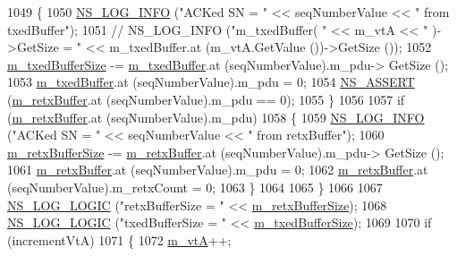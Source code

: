 \begin{DoxyCode}
1049                 \{
1050                   \hyperlink{group__logging_gafbd73ee2cf9f26b319f49086d8e860fb}{NS\_LOG\_INFO} (\textcolor{stringliteral}{"ACKed SN = "} << seqNumberValue << \textcolor{stringliteral}{" from txedBuffer"});
1051                   \textcolor{comment}{//               NS\_LOG\_INFO ("m\_txedBuffer( " << m\_vtA << " )->GetSize = " <<
       m\_txedBuffer.at (m\_vtA.GetValue ())->GetSize ());}
1052                   \hyperlink{classns3_1_1LteRlcAm_add3fe05a0fd3a4ad1fcb7db0239c698f}{m\_txedBufferSize} -= \hyperlink{classns3_1_1LteRlcAm_afabb45c6de7da492347b45c139de0c28}{m\_txedBuffer}.at (seqNumberValue).m\_pdu->
      GetSize ();
1053                   \hyperlink{classns3_1_1LteRlcAm_afabb45c6de7da492347b45c139de0c28}{m\_txedBuffer}.at (seqNumberValue).m\_pdu = 0;
1054                   \hyperlink{assert_8h_a6dccdb0de9b252f60088ce281c49d052}{NS\_ASSERT} (\hyperlink{classns3_1_1LteRlcAm_ab34bb5fce080a41395ad7ea5789af8d0}{m\_retxBuffer}.at (seqNumberValue).m\_pdu == 0);
1055                 \}
1056 
1057               \textcolor{keywordflow}{if} (\hyperlink{classns3_1_1LteRlcAm_ab34bb5fce080a41395ad7ea5789af8d0}{m\_retxBuffer}.at (seqNumberValue).m\_pdu)
1058                 \{
1059                   \hyperlink{group__logging_gafbd73ee2cf9f26b319f49086d8e860fb}{NS\_LOG\_INFO} (\textcolor{stringliteral}{"ACKed SN = "} << seqNumberValue << \textcolor{stringliteral}{" from retxBuffer"});
1060                   \hyperlink{classns3_1_1LteRlcAm_af270916ffd1805b027a7b9cc05c91e7d}{m\_retxBufferSize} -= \hyperlink{classns3_1_1LteRlcAm_ab34bb5fce080a41395ad7ea5789af8d0}{m\_retxBuffer}.at (seqNumberValue).m\_pdu->
      GetSize ();
1061                   \hyperlink{classns3_1_1LteRlcAm_ab34bb5fce080a41395ad7ea5789af8d0}{m\_retxBuffer}.at (seqNumberValue).m\_pdu = 0;
1062                   \hyperlink{classns3_1_1LteRlcAm_ab34bb5fce080a41395ad7ea5789af8d0}{m\_retxBuffer}.at (seqNumberValue).m\_retxCount = 0;
1063                 \}
1064 
1065             \}
1066 
1067           \hyperlink{group__logging_ga88acd260151caf2db9c0fc84997f45ce}{NS\_LOG\_LOGIC} (\textcolor{stringliteral}{"retxBufferSize = "} << \hyperlink{classns3_1_1LteRlcAm_af270916ffd1805b027a7b9cc05c91e7d}{m\_retxBufferSize});
1068           \hyperlink{group__logging_ga88acd260151caf2db9c0fc84997f45ce}{NS\_LOG\_LOGIC} (\textcolor{stringliteral}{"txedBufferSize = "} << \hyperlink{classns3_1_1LteRlcAm_add3fe05a0fd3a4ad1fcb7db0239c698f}{m\_txedBufferSize});      
1069 
1070           \textcolor{keywordflow}{if} (incrementVtA)
1071             \{
1072               \hyperlink{classns3_1_1LteRlcAm_a55514b9f03d8f70cdbb8cdac053f39b5}{m\_vtA}++;

\end{DoxyCode}
